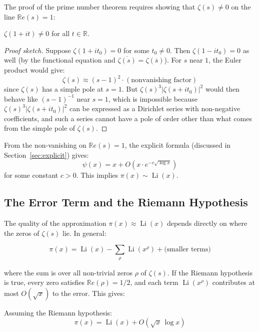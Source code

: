 The proof of the prime number theorem requires showing that $\zeta(s) \neq 0$ on the line $\mathbb{R}e(s) = 1$:

\begin{theorem}
\label{thm:nozeroline1}
$\zeta(1 + it) \neq 0$ for all $t \in \mathbb{R}$.
\end{theorem}

\begin{proof}[Proof sketch]
Suppose $\zeta(1 + it_0) = 0$ for some $t_0 \neq 0$. Then $\zeta(1 - it_0) = 0$ as well (by the functional equation and $\overline{\zeta(s)} = \zeta(\overline{s})$). For $s$ near $1$, the Euler product would give:
\[
\zeta(s) \approx (s - 1)^2 \cdot (\text{nonvanishing factor})
\]
since $\zeta(s)$ has a simple pole at $s = 1$. But $\zeta(s)^3 |\zeta(s + it_0)|^2$ would then behave like $(s-1)^{-1}$ near $s = 1$, which is impossible because $\zeta(s)^3 |\zeta(s+it_0)|^2$ can be expressed as a Dirichlet series with non-negative coefficients, and such a series cannot have a pole of order other than what comes from the simple pole of $\zeta(s)$.
\end{proof}

From the non-vanishing on $\mathbb{R}e(s) = 1$, the explicit formula (discussed in Section~\ref{sec:explicit}) gives:
\[
\psi(x) = x + O(x \cdot e^{-c\sqrt{\log x}})
\]
for some constant $c > 0$. This implies $\pi(x) \sim \operatorname{Li}(x)$.

\subsection{The Error Term and the Riemann Hypothesis}

The quality of the approximation $\pi(x) \approx \operatorname{Li}(x)$ depends directly on where the zeros of $\zeta(s)$ lie. In general:

\[
\pi(x) = \operatorname{Li}(x) - \sum_{\rho} \operatorname{Li}(x^{\rho}) + \text{(smaller terms)}
\]

where the sum is over all non-trivial zeros $\rho$ of $\zeta(s)$. If the Riemann hypothesis is true, every zero satisfies $\mathbb{R}e(\rho) = 1/2$, and each term $\operatorname{Li}(x^{\rho})$ contributes at most $O(\sqrt{x})$ to the error. This gives:

\begin{theorem}
Assuming the Riemann hypothesis:
\[
\pi(x) = \operatorname{Li}(x) + O(\sqrt{x} \, \log x)
\]
\end{theorem}

